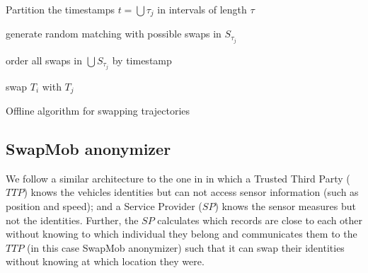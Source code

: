 \documentclass[]{llncs}
\begin{document}
\begin{algorithm}[t]
\SetAlgoNoLine
{}

Partition the timestamps $t =\bigcup \tau_j$ in intervals of length $\tau$

generate random matching with possible swaps in $S_{\tau_j}$\

order all swaps in $\bigcup S_{\tau_j}$ by timestamp\

{swap $T_i$ with $T_j$}

\caption{Offline algorithm for swapping trajectories}
\label{alg:one}
\end{algorithm}


\subsection{SwapMob anonymizer}

We follow a similar architecture to the one in \cite{Hoh06} in which a Trusted Third Party ($TTP$) knows the
vehicles identities but can not access sensor information (such as position and  speed); and a Service Provider ($SP$) knows the sensor measures but not the identities. 
Further, the $SP$ calculates which records are close to each other without knowing to which individual they belong and communicates them to the $TTP$ (in this case SwapMob anonymizer) such that it can swap their identities without knowing at which location they were.
\end{document}

